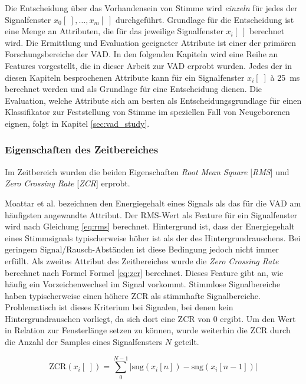 Die Entscheidung über das Vorhandensein von Stimme wird \emph{einzeln} für jedes der Signalfenster $x_0[\;] , \ldots , x_m[\;]$ durchgeführt. Grundlage für die Entscheidung ist eine Menge an Attributen, die für das jeweilige Signalfenster $x_i[\;]$ berechnet wird. Die Ermittlung und Evaluation geeigneter Attribute ist einer der primären Forschungsbereiche der VAD. In den folgenden Kapiteln wird eine Reihe an Features vorgestellt, die in dieser Arbeit zur VAD erprobt wurden. Jedes der in diesen Kapiteln besprochenen Attribute kann für ein Signalfenster $x_i[\;]$ \`{a} \SI{25}{\milli\second} berechnet werden und als Grundlage für eine Entscheidung dienen. Die Evaluation, welche Attribute sich am besten als Entscheidungsgrundlage für einen Klassifikator zur Feststellung von Stimme im speziellen Fall von Neugeborenen eignen, folgt in Kapitel \ref{sec:vad_study}.

\subsubsection{Eigenschaften des Zeitbereiches}
\label{sec:vad_time_features}

Im Zeitbereich wurden die beiden Eigenschaften \emph{Root Mean Square} [\emph{RMS}] und \emph{Zero Crossing Rate} [\emph{ZCR}] erprobt.

Moattar et al. \cite{vad_Easy} bezeichnen den Energiegehalt eines Signals als das für die VAD am häufigsten angewandte Attribut. Der RMS-Wert als Feature für ein Signalfenster wird nach Gleichung \ref{eq:rms} berechnet. Hintergrund ist, dass der Energiegehalt eines Stimmsignals typischerweise höher ist als der des Hintergrundrauschens. Bei geringem Signal/Rausch-Abständen ist diese Bedingung jedoch nicht immer erfüllt. Als zweites Attribut des Zeitbereiches wurde die \emph{Zero Crossing Rate} berechnet nach Formel Formel \ref{eq:zcr} berechnet. Dieses Feature gibt an, wie häufig ein Vorzeichenwechsel im Signal vorkommt. Stimmlose Signalbereiche haben typischerweise einen höhere ZCR als stimmhafte Signalbereiche. Problematisch ist dieses Kriterium bei Signalen, bei denen kein Hintergrundrauschen vorliegt, da sich dort eine ZCR von 0 ergibt.\cite{vad_ceps} Um den Wert in Relation zur Fensterlänge setzen zu können, wurde weiterhin die ZCR durch die Anzahl der Samples eines Signalfensters $N$ geteilt.

\begin{equation}
\text{ZCR}(x_i[\;]) = \sum_{0}^{N-1}|\text{sng}(x_i[n])-\text{sng}(x_i[n-1])|
\label{eq:zcr}
\end{equation}

